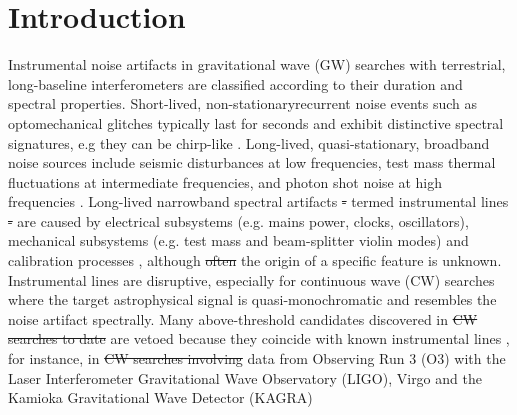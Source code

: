 \documentclass[pra,superscriptaddress,reprint,amsmath,amssymb,nofootinbib]{revtex4-2}
\providecommand{\DIFaddtex}[1]{{\protect\color{blue}\uwave{#1}}} %
\providecommand{\DIFdeltex}[1]{{\protect\color{red}\sout{#1}}}                      %
\providecommand{\DIFaddbegin}{} %
\providecommand{\DIFaddend}{} %
\providecommand{\DIFdelbegin}{} %
\providecommand{\DIFdelend}{} %
\providecommand{\DIFadd}[1]{\texorpdfstring{\DIFaddtex{#1}}{#1}} %
\providecommand{\DIFdel}[1]{\texorpdfstring{\DIFdeltex{#1}}{}} %
\newcommand{\DIFscaledelfig}{0.5}
\newlength{\DIFdelgraphicswidth} %
\newlength{\DIFdelgraphicsheight} %
\newcommand{\DIFaddincludegraphics}[2][]{{\color{blue}\fbox{\DIFOincludegraphics[#1]{#2}}}} %
\newcommand{\DIFdelincludegraphics}[2][]{%
\sbox{\DIFdelgraphicsbox}{\DIFOincludegraphics[#1]{#2}}%
\settoboxwidth{\DIFdelgraphicswidth}{\DIFdelgraphicsbox} %
\settoboxtotalheight{\DIFdelgraphicsheight}{\DIFdelgraphicsbox} %
\scalebox{\DIFscaledelfig}{%
\parbox[b]{\DIFdelgraphicswidth}{\usebox{\DIFdelgraphicsbox}\\[-\baselineskip] \rule{\DIFdelgraphicswidth}{0em}}\llap{\resizebox{\DIFdelgraphicswidth}{\DIFdelgraphicsheight}{%
\setlength{\unitlength}{\DIFdelgraphicswidth}%
\begin{picture}(1,1)%
\thicklines\linethickness{2pt} %
{\color[rgb]{1,0,0}\put(0,0){\framebox(1,1){}}}%
{\color[rgb]{1,0,0}\put(0,0){\line( 1,1){1}}}%
{\color[rgb]{1,0,0}\put(0,1){\line(1,-1){1}}}%
\end{picture}%
}\hspace*{3pt}}} %
} %
\DeclareRobustCommand{\DIFaddbegin}{\DIFOaddbegin \let\includegraphics\DIFaddincludegraphics} %
\DeclareRobustCommand{\DIFaddend}{\DIFOaddend \let\includegraphics\DIFOincludegraphics} %
\DeclareRobustCommand{\DIFdelbegin}{\DIFOdelbegin \let\includegraphics\DIFdelincludegraphics} %
\DeclareRobustCommand{\DIFdelend}{\DIFOaddend \let\includegraphics\DIFOincludegraphics} %
\begin{document}
\maketitle	


\section{Introduction} \label{sec:intro}
Instrumental noise artifacts in gravitational wave (GW) searches with terrestrial, long-baseline interferometers are classified according to their duration and spectral properties.  Short-lived, non-stationary\DIFaddbegin \DIFadd{, }\DIFaddend recurrent noise events such as optomechanical glitches typically last for seconds and exhibit distinctive spectral signatures, e.g they can be chirp-like \cite{Blackburn2008,Aasi2012,Aasi2015,DetCharGW150914:2016,Glanzer2023}. Long-lived, quasi-stationary, broadband noise sources include seismic disturbances at low frequencies, test mass thermal fluctuations at intermediate frequencies, and photon shot noise at high frequencies \cite{AasiEtAlAdLIGO:2015,LIGOnoiseguide,VIROGnoise,Akutsu2021PTEP,Nguyen2021}. Long-lived narrowband spectral artifacts \DIFdelbegin \DIFdel{- }\DIFdelend \DIFaddbegin \DIFadd{--- }\DIFaddend termed instrumental lines \DIFdelbegin \DIFdel{- }\DIFdelend \DIFaddbegin \DIFadd{--- }\DIFaddend are caused by electrical subsystems (e.g. mains power, clocks, oscillators), mechanical subsystems (e.g. test mass and beam-splitter violin modes) and calibration processes \cite{CovasEtAl:2018}, although \DIFdelbegin \DIFdel{often }\DIFdelend \DIFaddbegin \DIFadd{sometimes }\DIFaddend the origin of a specific feature is unknown. Instrumental lines are disruptive, especially for continuous wave (CW) searches where the target astrophysical signal is quasi-monochromatic and resembles the noise artifact spectrally. Many above-threshold candidates discovered in \DIFdelbegin \DIFdel{CW searches to date }\DIFdelend \DIFaddbegin \DIFadd{published CW searches }\DIFaddend are vetoed because they coincide with known instrumental lines \cite{Piccinni2022,Riles2023,Wette2023}, for instance, in \DIFdelbegin \DIFdel{CW searches involving }\DIFdelend data from Observing Run 3 (O3) with the Laser Interferometer Gravitational Wave Observatory (LIGO), Virgo and the Kamioka Gravitational Wave Detector (KAGRA)  \cite[e.g.][]{Ligo_lineveto1,ligo_lineveto2,ligo_lineveto3} \newline 
\end{document}
